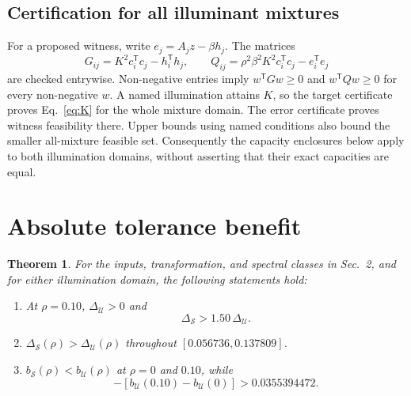 \documentclass{optica-article}
\newtheorem{theorem}{Theorem}
\begin{document}
\subsection{Certification for all illuminant mixtures}
For a proposed witness, write $e_j=A_jz-\beta h_j$. The matrices
\begin{equation}
 G_{ij}=K^2c_i^{\mathsf T}c_j-h_i^{\mathsf T}h_j,
 \qquad
 Q_{ij}=\rho^2\beta^2K^2c_i^{\mathsf T}c_j-e_i^{\mathsf T}e_j
 \label{eq:grams}
\end{equation}
are checked entrywise. Non-negative entries imply $w^{\mathsf T}Gw\geq0$ and $w^{\mathsf T}Qw\geq0$ for every non-negative $w$. A named illumination attains $K$, so the target certificate proves Eq.~\eqref{eq:K} for the whole mixture domain. The error certificate proves witness feasibility there. Upper bounds using named conditions also bound the smaller all-mixture feasible set. Consequently the capacity enclosures below apply to both illumination domains, without asserting that their exact capacities are equal.

\section{Absolute tolerance benefit}
\begin{theorem}\label{thm:main}
For the inputs, transformation, and spectral classes in Sec.~2, and for either illumination domain, the following statements hold:
\begin{enumerate}
\item At $\rho=0.10$, $\Delta_{\mathcal U}>0$ and
\begin{equation}
 \Delta_{\mathcal S}>1.50\,\Delta_{\mathcal U}.
 \label{eq:mainresult}
\end{equation}
\item $\Delta_{\mathcal S}(\rho)>\Delta_{\mathcal U}(\rho)$ throughout $[0.056736,0.137809]$.
\item $b_{\mathcal S}(\rho)<b_{\mathcal U}(\rho)$ at $\rho=0$ and $0.10$, while
\begin{equation}
 [b_{\mathcal S}(0.10)-b_{\mathcal S}(0)]-
 [b_{\mathcal U}(0.10)-b_{\mathcal U}(0)]>0.0355394472.
 \label{eq:rawgain}
\end{equation}
\end{enumerate}
\end{theorem}
\end{document}
